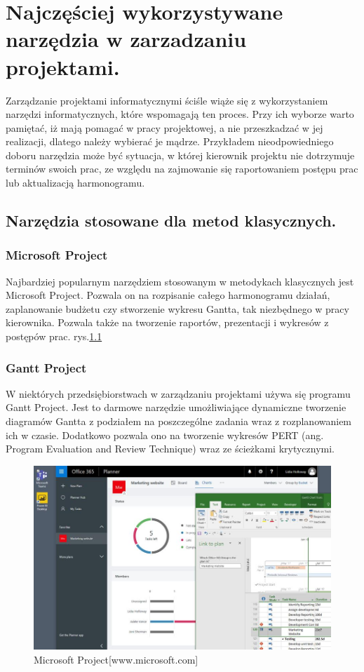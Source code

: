 
\chapter{Najczęściej wykorzystywane narzędzia w zarzadzaniu projektami.}

Zarządzanie projektami informatycznymi ściśle wiąże się z wykorzystaniem narzędzi informatycznych, które wspomagają ten proces. Przy ich wyborze warto pamiętać, iż mają pomagać w pracy projektowej, a nie przeszkadzać w jej realizacji, dlatego należy wybierać je mądrze. Przykładem nieodpowiedniego doboru narzędzia może być sytuacja, w której kierownik projektu nie dotrzymuje terminów swoich prac, ze względu na zajmowanie się raportowaniem postępu prac lub aktualizacją harmonogramu.\cite{Kopczewski_2015}

\section{Narzędzia stosowane dla metod klasycznych.}

\subsection{Microsoft Project}

Najbardziej popularnym narzędziem stosowanym w metodykach klasycznych jest Microsoft Project. Pozwala on na rozpisanie całego harmonogramu działań, zaplanowanie budżetu czy stworzenie wykresu Gantta, tak niezbędnego w pracy kierownika. Pozwala także na tworzenie raportów, prezentacji i wykresów z postępów prac. rys.\ref{rys:project}

\subsection{Gantt Project}

W niektórych przedsiębiorstwach w zarządzaniu projektami używa się programu Gantt Project. Jest to darmowe narzędzie umożliwiające dynamiczne tworzenie diagramów Gantta z podziałem na poszczególne zadania wraz z rozplanowaniem ich w czasie. Dodatkowo pozwala ono na tworzenie wykresów PERT (ang. Program Evaluation and Review Technique) wraz ze ścieżkami krytycznymi.\cite{Trendy_Zarzadzanie}

\begin{figure}
	\centering\includegraphics[width=.6\textwidth]{img/Microsoft_Project}
	\caption{Microsoft Project[www.microsoft.com]} \label{rys:project}%
\end{figure}

